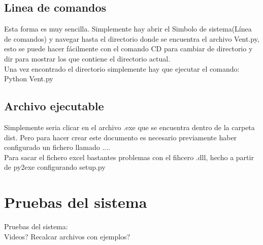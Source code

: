 \subsection{Linea de comandos}
Esta forma es muy sencilla. Simplemente hay abrir el Simbolo de sistema(Línea de comandos) y navegar hasta el directorio donde se encuentra el archivo Vent.py, esto se puede hacer fácilmente con el comando CD para cambiar de directorio y dir para mostrar los que contiene el directorio actual.\\
Una vez encontrado el directorio simplemente hay que ejecutar el comando: Python Vent.py\\

\subsection{Archivo ejecutable}
Simplemente seria clicar en el archivo .exe que se encuentra dentro de la carpeta dist.
Pero para hacer crear este documento es necesario previamente haber configurado un fichero llamado ....\\

Para sacar el fichero excel bastantes problemas con el fihcero .dll, hecho a partir de py2exe configurando setup.py
\section{Pruebas del sistema}
Pruebas del sistema:\\
Videos? Recalcar archivos con ejemplos?